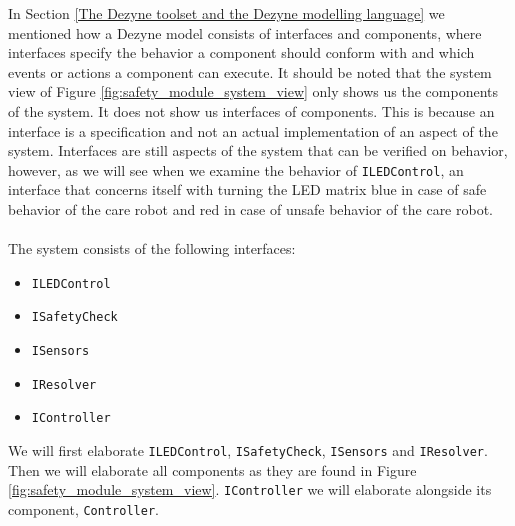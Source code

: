 \documentclass[12pt]{scrreprt}
\begin{document}
\par
In Section \ref{The Dezyne toolset and the Dezyne modelling language} we mentioned how a Dezyne model consists of interfaces and components, where interfaces specify the behavior a component should conform with and which events or actions a component can execute. It should be noted that the system view of Figure \ref{fig:safety_module_system_view} only shows us the components of the system. It does not show us interfaces of components. This is because an interface is a specification and not an actual implementation of an aspect of the system. Interfaces are still aspects of the system that can be verified on behavior, however, as we will see when we examine the behavior of \texttt{ILEDControl}, an interface that concerns itself with turning the LED matrix blue in case of safe behavior of the care robot and red in case of unsafe behavior of the care robot.
\\\\
The system consists of the following interfaces:

\begin{itemize}
    \item \texttt{ILEDControl}
    \item \texttt{ISafetyCheck}
    \item \texttt{ISensors}
    \item \texttt{IResolver}
    \item \texttt{IController}
\end{itemize}

We will first elaborate \texttt{ILEDControl}, \texttt{ISafetyCheck}, \texttt{ISensors} and \texttt{IResolver}. Then we will elaborate all components as they are found in Figure \ref{fig:safety_module_system_view}. \texttt{IController} we will elaborate alongside its component, \texttt{Controller}.
\end{document}
